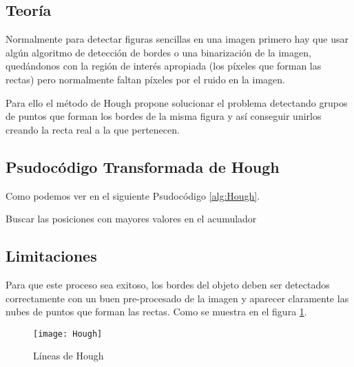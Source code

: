 \subsection{Teoría}

Normalmente para detectar figuras sencillas en una imagen primero hay que usar algún algoritmo de detección de bordes o una binarización de la imagen, quedándonos con la región de interés apropiada (los píxeles que forman las rectas) pero normalmente faltan píxeles por el ruido en la imagen.

Para ello el método de Hough propone solucionar el problema detectando grupos de puntos que forman los bordes de la misma figura y así conseguir unirlos creando la recta real a la que pertenecen.

\subsection{Psudocódigo Transformada de Hough}
Como podemos ver en el siguiente Psudocódigo 
\ref{alg:Hough}.

\begin{algorithm*}
\DontPrintSemicolon
{}


Buscar las posiciones con mayores valores en el acumulador\;	

\label{alg:Hough}
\end{algorithm*}

\subsection{Limitaciones}
Para que este proceso sea exitoso, los bordes del objeto deben ser detectados correctamente con un buen pre-procesado de la imagen y aparecer claramente las nubes de puntos que forman las rectas.
Como se muestra en el figura \ref{fig:3.5}.

\begin{figure}[h]
\centering
\texttt{[image: Hough]}
\caption{Líneas de Hough\cite{opencv:HoughIm}}
\label{fig:3.5}
\end{figure}
